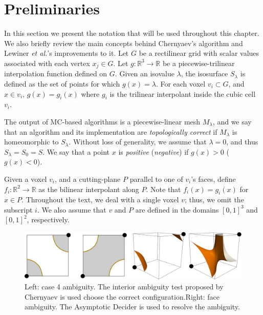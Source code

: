 
\section{Preliminaries}
\label{sec:preliminaries}

In this section we present the notation that will be used throughout this chapter. We also briefly review the main concepts behind Chernyaev's algorithm and Lewiner \emph{et al.}'s improvements to it. 
%
Let $G$ be a rectilinear grid with scalar values associated with each vertex $x_j \in G$. Let $g:\mathbb{R}^3 \rightarrow \mathbb{R}$ be a piecewise-trilinear interpolation function defined on $G$. Given an isovalue $\lambda$,  the isosurface $S_\lambda$ is defined as the set of points for which $g(x)=\lambda$. For each voxel $v_i \subset G$, and $x \in v_i$, $g(x) = g_i(x)$ where $g_i$ is the trilinear interpolant inside the cubic cell $v_i$. 

The output of MC-based algorithms is a piecewise-linear mesh $M_\lambda$, and we say that an algorithm and its implementation are \emph{topologically correct} if $M_\lambda$ is homeomorphic to $S_\lambda$. Without loss of generality, we assume that $\lambda = 0$, and thus $S_\lambda = S_0 = S$. We say that a point $x$ is \emph{positive} (\emph{negative}) if $g(x) > 0$ ($g(x) < 0$). 

Given a voxel $v_i$, and a cutting-plane $P$ parallel to one of $v_i$'s faces, define  $f_i:\mathbb{R}^2 \rightarrow \mathbb{R}$ as the bilinear interpolant along $P$. Note that $f_i(x) = g_i(x)$ for $x \in P$. Throughout the text, we deal with a single voxel $v$; thus, we omit the subscript $i$. We also assume that $v$ and $P$ are defined in the domains  $[0,1]^3$ and $[0,1]^2$, respectively.

\begin{figure}[b]
     \centering
     \includegraphics[width=1\linewidth]{chapter4/figures/ambiguity.png}
     \caption{Left: case 4 ambiguity. The interior ambiguity test proposed by Chernyaev is used choose the correct configuration.Right: face ambiguity. The Asymptotic Decider  is used to resolve the ambiguity.}
     \label{ambiguity}
\end{figure}
 
